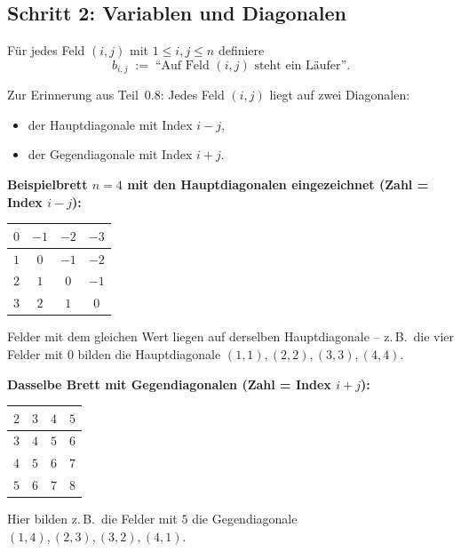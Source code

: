 \documentclass[a4paper,12pt]{article}
\begin{document}
\subsection*{Schritt 2: Variablen und Diagonalen}

\begin{merkbox}[title={Die Variablen}]
F\"ur jedes Feld $(i, j)$ mit $1 \le i, j \le n$ definiere
\[
b_{i,j} \;:=\; \text{``Auf Feld $(i,j)$ steht ein L\"aufer''}.
\]
\end{merkbox}

Zur Erinnerung aus Teil~0.8: Jedes Feld $(i,j)$ liegt auf zwei
Diagonalen:
\begin{itemize}[nosep]
\item der Hauptdiagonale mit Index $i - j$,
\item der Gegendiagonale mit Index $i + j$.
\end{itemize}

\textbf{Beispielbrett $n = 4$ mit den Hauptdiagonalen eingezeichnet
(Zahl = Index $i-j$):}

\begin{center}
\renewcommand{\arraystretch}{1.3}
\begin{tabular}{|c|c|c|c|}
\hline
$0$ & $-1$ & $-2$ & $-3$ \\ \hline
$1$ & $0$ & $-1$ & $-2$ \\ \hline
$2$ & $1$ & $0$ & $-1$ \\ \hline
$3$ & $2$ & $1$ & $0$ \\ \hline
\end{tabular}
\end{center}

Felder mit dem gleichen Wert liegen auf derselben Hauptdiagonale --
z.\,B.\ die vier Felder mit $0$ bilden die Hauptdiagonale $(1,1),
(2,2), (3,3), (4,4)$.

\textbf{Dasselbe Brett mit Gegendiagonalen (Zahl = Index $i+j$):}

\begin{center}
\renewcommand{\arraystretch}{1.3}
\begin{tabular}{|c|c|c|c|}
\hline
$2$ & $3$ & $4$ & $5$ \\ \hline
$3$ & $4$ & $5$ & $6$ \\ \hline
$4$ & $5$ & $6$ & $7$ \\ \hline
$5$ & $6$ & $7$ & $8$ \\ \hline
\end{tabular}
\end{center}

Hier bilden z.\,B.\ die Felder mit $5$ die Gegendiagonale $(1,4),
(2,3), (3,2), (4,1)$.
\end{document}
